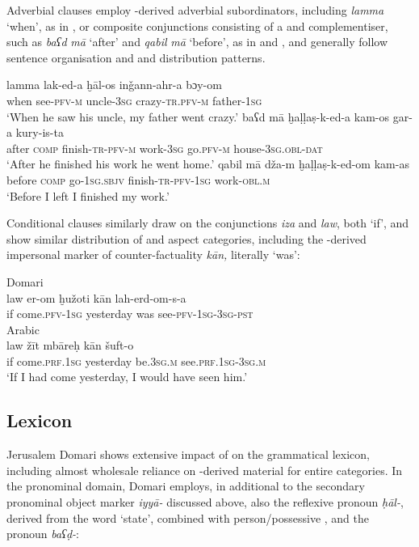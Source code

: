 \documentclass[output=paper]{langsci/langscibook}
\begin{document}
Adverbial clauses employ -derived adverbial subordinators, including \textit{lamma} ‘when’, as in , or composite conjunctions consisting of a  and complementiser, such as \textit{baʕd} \textit{mā} ‘after’ and \textit{qabil} \textit{mā} ‘before’, as in  and , and generally follow  sentence organisation and  and  distribution patterns.

\ea\label{lamma} \gll lamma lak-ed-a ḫāl-os inǧann-ahr-a bɔy-om\\
       when see-\textsc{pfv-m} uncle-\textsc{3sg} crazy-\textsc{tr.pfv-m} father-\textsc{1sg}\\
\glt     ‘When he saw his uncle, my father went crazy.’
\ex\label{after} \gll baʕd mā ḫaḷḷaṣ-k-ed-a kam-os gar-a kury-is-ta\\
     after \textsc{comp} finish-\textsc{tr-pfv-m} work-\textsc{3sg} go.\textsc{pfv-m} house-\textsc{3sg.obl-dat}\\
\glt     ‘After he finished his work he went home.’
\ex\label{before} \gll qabil mā dža-m ḫaḷḷaṣ-k-ed-om kam-as\\
       before  \textsc{comp} go-\textsc{1sg.sbjv} finish-\textsc{tr-pfv-1sg} work-\textsc{obl.m}\\
\glt     ‘Before I left I finished my work.’
\z

Conditional clauses similarly draw on the  conjunctions \textit{iza} and \textit{law}, both ‘if’, and show similar distribution of  and aspect categories, including the -derived impersonal marker of counter-factuality \textit{kān,} literally ‘was’:

\ea
\ea
{Domari}\\
\gll law er-om ḫužoti kān lah-erd-om-s-a \\
       if come.\textsc{pfv-1sg} yesterday was see-\textsc{pfv-1sg-3sg-pst}\\
\ex
{Arabic}\\
\gll law žīt mbāreḥ kān šuft-o  \\
       if come.\textsc{prf.1sg} yesterday be.\textsc{3sg.m} see.\textsc{prf.1sg-3sg.m}\\
\glt   ‘If I had come yesterday, I would have seen him.’
\z
\z

\subsection{Lexicon}

Jerusalem Domari shows extensive impact of  on the grammatical lexicon, including almost wholesale reliance on -derived material for entire categories. In the pronominal domain, Domari employs, in additional to the secondary pronominal object marker \textit{iyyā-} discussed above, also the  reflexive pronoun \textit{ḥāl-}, derived from the word ‘state’, combined with person/possessive , and the   pronoun \textit{baʕḍ-}:
\end{document}
